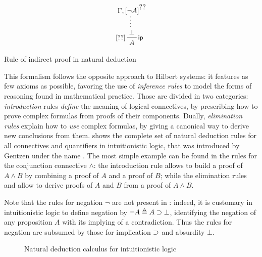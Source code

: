 \begin{marginfigure}
  $$
  \prftree[r][l]{\rsf{ip}}{\small[\prfref<HA>]}
  {\summ
    {\Gamma, \prfboundedassumption<HA>{\neg A}}
    {\bot}}
  {A}    
  $$
  \caption{Rule of indirect proof in natural deduction}
\end{marginfigure}

This formalism follows the opposite approach to Hilbert systems: it features as
few axioms as possible, favoring the use of \emph{inference rules} to model the
forms of reasoning found in mathematical practice. Those are divided in two
categories: \emph{introduction} rules \emph{define} the meaning of logical
connectives, by prescribing how to prove complex formulas from proofs of their
components. Dually, \emph{elimination rules} explain how to \emph{use} complex
formulas, by giving a canonical way to derive new conclusions from them.
 shows the complete set of natural deduction rules for all
connectives and quantifiers in intuitionistic logic, that was introduced by
Gentzen under the name  \cite{gentzen_untersuchungen_1935}. The most simple example can be
found in the rules for the conjunction connective $\land$: the introduction rule
 allows to build a proof of $A \land B$ by combining a proof of $A$
and a proof of $B$; while the elimination rules  and  allow to derive proofs of $A$ and $B$ from a proof of $A \land B$.

\begin{remark}
  Note that the rules for negation $\neg$ are not present in
  : indeed, it is customary in intuitionistic logic to define
  negation by $\neg A \triangleq A \supset \bot$, identifying the negation of any
  proposition $A$ with its implying of a contradiction. Thus the rules for
  negation are subsumed by those for implication $\supset$ and absurdity $\bot$.
\end{remark}

\begin{figure*}
  
  \caption{Natural deduction calculus  for intuitionistic logic}
\end{figure*}

